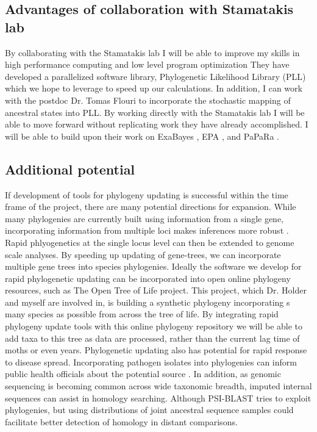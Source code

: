 \documentclass[10pt]{article}
\begin{document}
\subsection*{Advantages of collaboration with Stamatakis lab}

By collaborating with the Stamatakis lab I will be able to improve my skills in high performance computing and low level program optimization  
They have developed a parallelized software library, Phylogenetic Likelihood Library (PLL)  which we hope to leverage to speed up our calculations. 
In addition, I can work with the postdoc Dr. Tomas Flouri to incorporate the stochastic mapping of ancestral states into PLL.
By working directly with the Stamatakis lab I will be able to move forward without replicating work they have already accomplished.
I will be able to build upon their work on ExaBayes  \cite{Stamatakis_novel_2013} , EPA \cite{Berger_performance_2011}, and PaPaRa  \cite{Berger_aligning_2011} .


\subsection*{Additional potential}
If development of tools for phylogeny updating is successful within the time frame of the project, there are many potential directions for expansion. 
While many phylogenies are currently built using information from a single gene, incorporating information from multiple loci makes inferences more robust \cite{edwards_looking_2009}. 
Rapid phlyogenetics at the single locus level can then be extended to genome scale analyses.
By speeding up updating of gene-trees, we can incorporate multiple gene trees into species phylogenies.
Ideally the software we develop for rapid phylogenetic updating can be incorporated into open online phylogeny resources, such as The Open Tree of Life project. 
This project, which Dr. 
Holder and myself are involved in, is building a synthetic phylogeny incorporating s many species as possible from across the tree of life. 
By integrating rapid phylogeny update tools with this online phylogeny repository we will be able to add taxa to this tree as data are processed, rather than the current lag time of moths or even years. 
Phylogenetic updating also has potential for rapid response to disease spread. 
Incorporating pathogen isolates into phylogenies can inform public health officials about the potential source \cite{timme_phylogenetic_2013}.
In addition, as genomic sequencing is becoming common across wide taxonomic breadth, imputed internal sequences can assist in homology searching.
Although PSI-BLAST \cite{altschul_gapped_1997} tries to exploit phylogenies, but using distributions of joint ancestral sequence samples could facilitate better detection of homology in distant comparisons.
\end{document}
